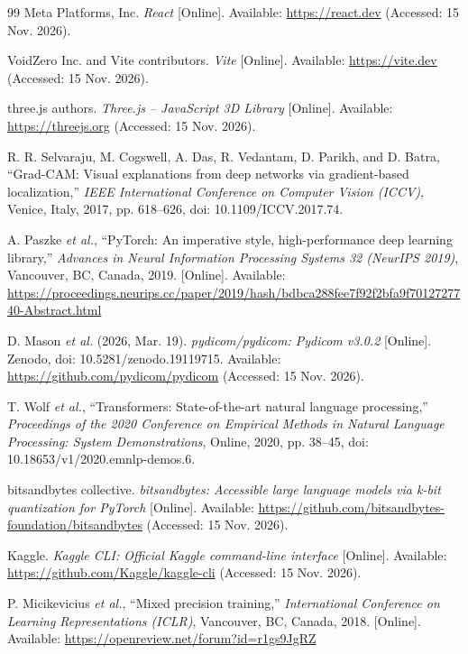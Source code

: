 \begin{thebibliography}{99}
 Meta Platforms, Inc. \textit{React} [Online]. Available: \url{https://react.dev} (Accessed: 15 Nov. 2026).

 VoidZero Inc. and Vite contributors. \textit{Vite} [Online]. Available: \url{https://vite.dev} (Accessed: 15 Nov. 2026).

 three.js authors. \textit{Three.js -- JavaScript 3D Library} [Online]. Available: \url{https://threejs.org} (Accessed: 15 Nov. 2026).

 R. R. Selvaraju, M. Cogswell, A. Das, R. Vedantam, D. Parikh, and D. Batra, ``Grad-CAM: Visual explanations from deep networks via gradient-based localization,'' \textit{IEEE International Conference on Computer Vision (ICCV)}, Venice, Italy, 2017, pp. 618--626, doi: 10.1109/ICCV.2017.74.

 A. Paszke \textit{et al.}, ``PyTorch: An imperative style, high-performance deep learning library,'' \textit{Advances in Neural Information Processing Systems 32 (NeurIPS 2019)}, Vancouver, BC, Canada, 2019. [Online]. Available: \url{https://proceedings.neurips.cc/paper/2019/hash/bdbca288fee7f92f2bfa9f7012727740-Abstract.html}

 D. Mason \textit{et al.} (2026, Mar. 19). \textit{pydicom/pydicom: Pydicom v3.0.2} [Online]. Zenodo, doi: 10.5281/zenodo.19119715. Available: \url{https://github.com/pydicom/pydicom} (Accessed: 15 Nov. 2026).

 T. Wolf \textit{et al.}, ``Transformers: State-of-the-art natural language processing,'' \textit{Proceedings of the 2020 Conference on Empirical Methods in Natural Language Processing: System Demonstrations}, Online, 2020, pp. 38--45, doi: 10.18653/v1/2020.emnlp-demos.6.

 bitsandbytes collective. \textit{bitsandbytes: Accessible large language models via k-bit quantization for PyTorch} [Online]. Available: \url{https://github.com/bitsandbytes-foundation/bitsandbytes} (Accessed: 15 Nov. 2026).

 Kaggle. \textit{Kaggle CLI: Official Kaggle command-line interface} [Online]. Available: \url{https://github.com/Kaggle/kaggle-cli} (Accessed: 15 Nov. 2026).

 P. Micikevicius \textit{et al.}, ``Mixed precision training,'' \textit{International Conference on Learning Representations (ICLR)}, Vancouver, BC, Canada, 2018. [Online]. Available: \url{https://openreview.net/forum?id=r1gs9JgRZ}


\end{thebibliography}
